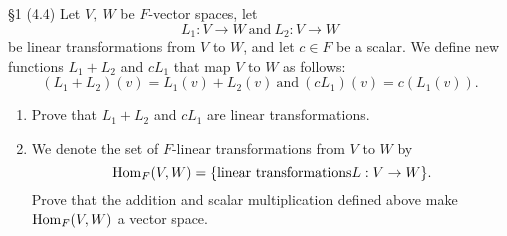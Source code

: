 \documentclass{homework}
\begin{document}
\begin{problem}{\S 1}
  (4.4) Let $V,\ W$ be $F$-vector spaces, let \[
    L_1:V\longrightarrow W~\text{and}~L_2:V\longrightarrow W
  \] be linear transformations from $V$ to $W$, and let $c\in F$ be a scalar. We define new
  functions $L_1+L_2$ and $cL_1$ that map $V$ to $W$ as follows: \[
    \left( L_1+L_2 \right)(v)=L_1(v)+L_2(v) ~\text{and}~ \left( cL_1 \right)(v)=c(L_1(v))
  .\]
  \begin{enumerate}[label=(\alph*)]
    \item Prove that $L_1+L_2$ and $cL_1$ are linear transformations.
    \item We denote the set of $F$-linear transformations from $V$ to $W$ by \[
        \operatorname{Hom}_F(V,W)=\{\text{linear transformations} L:V\to W \}
      .\] Prove that the addition and scalar multiplication defined above make $\operatorname{Hom}_F(V,W)$ a
      vector space.
  \end{enumerate}
\end{problem}
\end{document}
